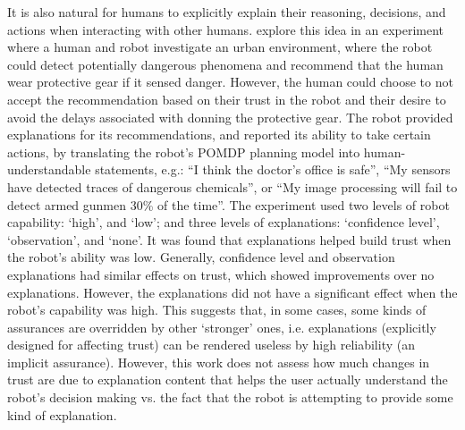 It is also natural for humans to explicitly explain their reasoning, decisions, and actions when interacting with other humans. 
\citet{Wang2016-id} explore this idea in an experiment where a human and robot investigate an urban environment, where the robot could detect potentially dangerous phenomena and recommend that the human wear protective gear if it sensed danger. 
However, the human could choose to not accept the recommendation based on their trust in the robot and their desire to avoid the delays associated with donning the protective gear. 
The robot provided explanations for its recommendations, and reported its ability to take certain actions, by translating the robot's POMDP planning model into human-understandable statements, e.g.: ``I think the doctor's office is safe'', ``My sensors have detected traces of dangerous chemicals'', or ``My image processing will fail to detect armed gunmen 30\% of the time''. 
The experiment used two levels of robot capability: `high', and `low'; and three levels of explanations: `confidence level', `observation', and `none'. 
It was found that explanations helped build trust when the robot's ability was low. 
Generally, confidence level and observation explanations had similar effects on trust, which showed improvements over no explanations. 
However, the explanations did not have a significant effect when the robot's capability was high. 
This suggests that, in some cases, some kinds of assurances are overridden by other `stronger' ones, i.e.  explanations (explicitly designed for affecting trust) can be rendered useless by high reliability (an implicit assurance). 
However, this work does not assess how much changes in trust are due to explanation content that helps the user actually understand the robot's decision making vs. the fact that the robot is attempting to provide some kind of explanation. 

